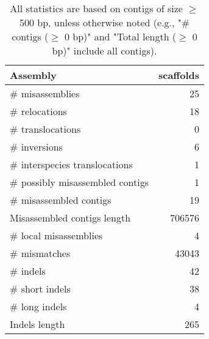 \documentclass[12pt,a4paper]{article}
\begin{document}
\begin{table}[ht]
\begin{center}
\caption{All statistics are based on contigs of size $\geq$ 500 bp, unless otherwise noted (e.g., "\# contigs ($\geq$ 0 bp)" and "Total length ($\geq$ 0 bp)" include all contigs).}
\begin{tabular}{|l*{1}{|r}|}
\hline
Assembly & scaffolds \\ \hline
\# misassemblies & 25 \\ \hline
\hspace{5mm}\# relocations & 18 \\ \hline
\hspace{5mm}\# translocations & 0 \\ \hline
\hspace{5mm}\# inversions & 6 \\ \hline
\hspace{5mm}\# interspecies translocations & 1 \\ \hline
\# possibly misassembled contigs & 1 \\ \hline
\# misassembled contigs & 19 \\ \hline
Misassembled contigs length & 706576 \\ \hline
\# local misassemblies & 4 \\ \hline
\# mismatches & 43043 \\ \hline
\# indels & 42 \\ \hline
\hspace{5mm}\# short indels & 38 \\ \hline
\hspace{5mm}\# long indels & 4 \\ \hline
Indels length & 265 \\ \hline
\end{tabular}
\end{center}
\end{table}
\end{document}
